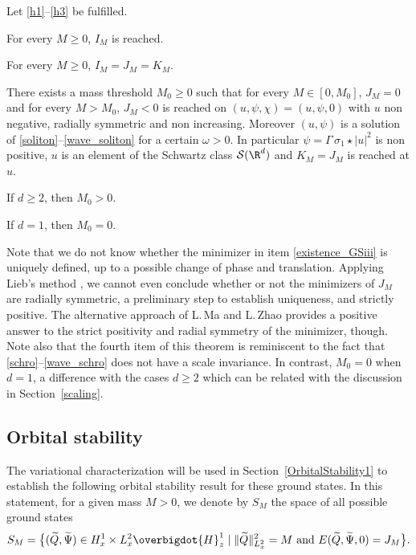 \begin{theo}\label{existence_GS}
Let \eqref{h1}--\eqref{h3} be fulfilled.
\begin{enumeratei}
\item\label{existence_GSi} For every $M\geq 0$, $I_{M}$ is reached.
\item\label{existence_GSii}
For every $M\geq 0$, $I_{M}=J_{M}=K_{M}$.
\item\label{existence_GSiii}
There exists a mass threshold $M_{0}\geq 0$ such that for every $M\in[0,M_{0}]$, $J_{M}=0$ and for every $M>M_{0}$, $J_{M}<0$ is reached on $(u,\psi,\chi)=(u,\psi,0)$ with $u$ non negative, radially symmetric and non increasing. Moreover $(u,\psi)$ is a solution of \eqref{soliton}--\eqref{wave_soliton} for a certain $\omega>0$. In particular $\psi=\Gamma\,\sigma_{1}\star|u|^{2}$ is non positive, $u$ is an element of the Schwartz class $\mathcal{S}(\R^{d})$ and $K_{M}=J_{M}$ is reached at $u$.
\item\label{existence_GSiv}
If $d\geq 2$, then $M_{0}>0$.
\item\label{existence_GSv}
If $d=1$, then $M_{0}=0$.
\end{enumeratei}
\end{theo}

Note that we do not know whether the minimizer in item \eqref{existence_GSiii} is uniquely defined, up to a possible change of phase and translation.
Applying Lieb's method \cite{Lieb_Choquard}, we cannot even conclude whether or not the minimizers of $J_{M}$ are
radially symmetric, a preliminary step
to establish uniqueness, and strictly positive.
The alternative approach of L.\,Ma and L.\,Zhao \cite[\S 5]{MaZ} provides a positive answer to the strict positivity and radial symmetry of the minimizer, though.
Note also that the fourth item of this theorem is reminiscent to the fact that \eqref{schro}--\eqref{wave_schro} does not have a scale invariance. In contrast,
$M_{0}=0$ when $d=1$, a difference with the cases $d\geq 2$ which can be related with the discussion in Section~\ref{scaling}.

\subsection{Orbital stability}

The variational characterization will be used in Section~\ref{OrbitalStability1} to establish the following orbital stability result for these ground states. In this statement, for a given mass $M>0$, we denote by $S_{M}$ the space of all possible ground states
\[
S_{M}=\bigl\{(\widetilde{Q},\widetilde{\Psi})\in H_{x}^{1}\times L_{x}^{2}\overbigdot{H}_{z}^{1}\mid\|\widetilde{Q}\|_{L_{x}^{2}}^{2}=M\text{ and }E(\widetilde{Q},\widetilde{\Psi},0)=J_{M}\bigr\}.
\]

